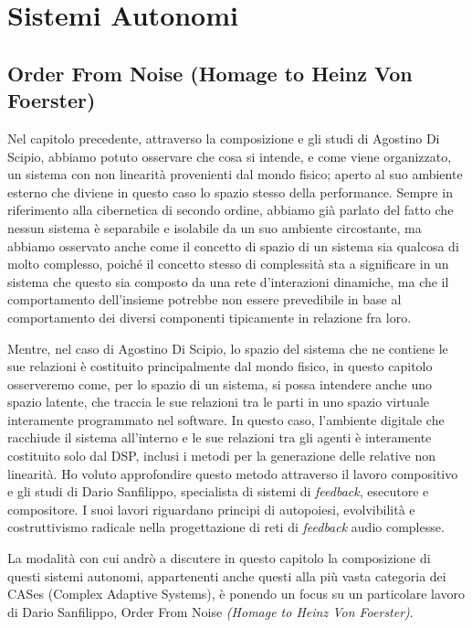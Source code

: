 \section{Sistemi Autonomi}
\label{sec:Sistemi Autonomi}

\subsection{Order From Noise (Homage to Heinz Von Foerster)}
\label{sec:Order From Noise (Homage to Heinz Von Foerster)}

Nel capitolo precedente, attraverso la composizione e gli studi di Agostino Di Scipio, 
abbiamo potuto osservare che cosa si intende, e come viene organizzato, 
un sistema con non linearità provenienti dal mondo fisico; aperto al suo ambiente esterno 
che diviene in questo caso lo spazio stesso della performance.
Sempre in riferimento alla cibernetica di secondo ordine,
abbiamo già parlato del fatto che nessun sistema è separabile e 
isolabile da un suo ambiente circostante, 
ma abbiamo osservato anche come il concetto di spazio di un sistema sia 
qualcosa di molto complesso, poiché il concetto stesso di complessità
sta a significare in un sistema che questo sia composto da una rete d'interazioni dinamiche, 
ma che il comportamento dell'insieme potrebbe non essere prevedibile in base al comportamento 
dei diversi componenti tipicamente in relazione fra loro.

Mentre, nel caso di Agostino Di Scipio, lo spazio del sistema che ne contiene le sue relazioni 
è costituito principalmente dal mondo fisico, 
in questo capitolo osserveremo come, per lo spazio di un sistema, 
si possa intendere anche uno spazio latente, 
che traccia le sue relazioni tra le parti in uno spazio virtuale interamente programmato nel software. 
In questo caso, l'ambiente digitale che racchiude il sistema all'interno e le sue relazioni 
tra gli agenti è interamente costituito solo dal DSP, 
inclusi i metodi per la generazione delle relative non linearità.
Ho voluto approfondire questo metodo attraverso il lavoro compositivo e gli studi di Dario Sanfilippo, 
specialista di sistemi di \emph{feedback}, esecutore e compositore. 
I suoi lavori riguardano principi di autopoiesi, evolvibilità e costruttivismo radicale nella progettazione 
di reti di \emph{feedback} audio complesse. 

La modalità con cui andrò a discutere in questo capitolo la composizione di questi
sistemi autonomi, appartenenti anche questi alla più vasta categoria dei CASes (Complex Adaptive Systems), 
è ponendo un focus su un particolare lavoro di Dario Sanfilippo, Order From Noise \textit{(Homage to Heinz Von Foerster)}.

